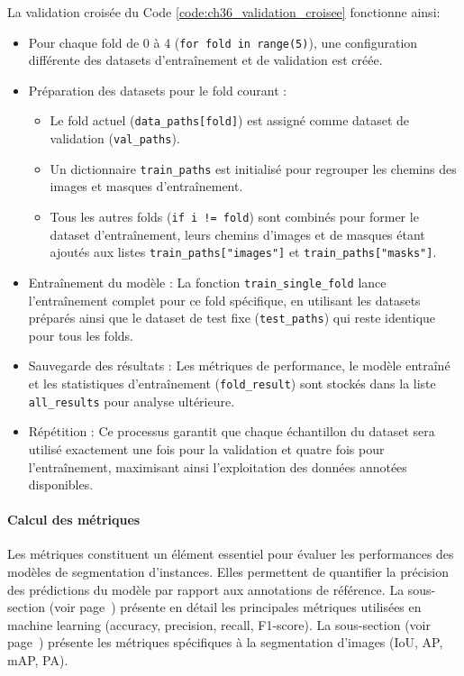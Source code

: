 La validation croisée du Code \ref{code:ch36_validation_croisee} fonctionne ainsi:
\begin{itemize}
    \item Pour chaque fold de 0 à 4 (\texttt{for fold in range(5)}), une configuration différente des datasets d'entraînement et de validation est créée.
    \item Préparation des datasets pour le fold courant :
    \begin{itemize}
        \item Le fold actuel (\texttt{data\_paths[fold]}) est assigné comme dataset de validation (\texttt{val\_paths}).
        \item Un dictionnaire \texttt{train\_paths} est initialisé pour regrouper les chemins des images et masques d'entraînement.
        \item Tous les autres folds (\texttt{if i != fold}) sont combinés pour former le dataset d'entraînement, leurs chemins d'images et de masques étant ajoutés aux listes \texttt{train\_paths["images"]} et \texttt{train\_paths["masks"]}.
    \end{itemize}
    \item Entraînement du modèle : La fonction \texttt{train\_single\_fold} lance l'entraînement complet pour ce fold spécifique, en utilisant les datasets préparés ainsi que le dataset de test fixe (\texttt{test\_paths}) qui reste identique pour tous les folds.
    \item Sauvegarde des résultats : Les métriques de performance, le modèle entraîné et les statistiques d'entraînement (\texttt{fold\_result}) sont stockés dans la liste \texttt{all\_results} pour analyse ultérieure.
    \item Répétition : Ce processus garantit que chaque échantillon du dataset sera utilisé exactement une fois pour la validation et quatre fois pour l'entraînement, maximisant ainsi l'exploitation des données annotées disponibles.
\end{itemize}

\paragraph{Calcul des métriques}
Les métriques constituent un élément essentiel pour évaluer les performances des modèles de segmentation d'instances. Elles permettent de quantifier la précision des prédictions du modèle par rapport aux annotations de référence. La sous-section \textit{} (voir page~\pageref{subsec:evaluation_performance_modele}) présente en détail les principales métriques utilisées en machine learning (accuracy, precision, recall, F1-score). La sous-section \textit{} (voir page~\pageref{subsec:evaluation_des_performances}) présente les métriques spécifiques à la segmentation d'images (IoU, AP, mAP, PA).


